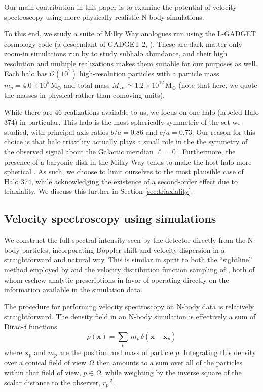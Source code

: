 \documentclass[aps,prl,10pt,twocolumn,superscriptaddress,showpacs]{revtex4-1}
\newcommand{\bvec}[1]{\mathbf{#1}}
\begin{document}
Our main contribution in this paper is to examine the potential of velocity spectroscopy using
more physically realistic N-body simulations.

To this end, we study a suite of Milky Way analogues run using the L-GADGET cosmology code
(a descendant of GADGET-2, \cite{springel2005}). These are dark-matter-only zoom-in simulations 
run by \cite{mao2015} to study subhalo abundance, and their high resolution and multiple
realizations makes them suitable for our purposes as well. Each halo has $\mathcal{O}(10^7)$
high-resolution particles with a particle mass $m_p=4.0\times10^5\, \mathrm{M_{\odot}}$ and total 
mass $M_{\mathrm{vir}}\simeq1.2\times10^{12}\,\mathrm{M_{\odot}}$ (note that here, we quote the masses in physical rather than comoving
units).

While there are 46 realizations available to us, we focus on one halo (labeled Halo 374) in particular. 
This halo is the most spherically-symmetric of the set we studied, with principal axis ratios
$b/a=0.86$ and $c/a=0.73$. Our reason for this choice is that halo triaxility actually plays a small role
in the the symmetry of the observed signal about the Galactic meridian $\ell=0^{\circ}$.
Furthermore, the presence of a baryonic disk in the Milky Way tends to make the host
halo more spherical \cite{debattista2008, bryan2013}. As such, we choose to limit ourselves to the most plausible case of
Halo 374, while acknowledging the existence of a second-order effect due to triaxiality. 
We discuss this further in Section \ref{sec:triaxiality}.


\subsection{Velocity spectroscopy using simulations}
\label{sec:simulations}

We construct the full
spectral intensity seen by the detector directly from the N-body particles, incorporating Doppler shift
and velocity dispersion in a straightforward and natural way.   This is similar in spirit to both the ``sightline'' method employed by 
\cite{lovell2015} and the velocity distribution function sampling of \cite{mao2013}, both of whom
eschew analytic prescriptions in favor of operating directly on the information available in the
simulation data. 

The procedure for performing velocity spectroscopy on N-body data is relatively straightforward.
The density field in an N-body simulation is effectively a sum of Dirac-$\delta$ functions
$$
\rho(\bvec{x}) = \sum_p\, m_p\, \delta(\bvec{x}-\bvec{x}_p)
$$
where $\bvec{x}_p$ and $m_p$ are the position and mass of particle $p$. Integrating this density over a conical
field of view $\Omega$ then amounts to a sum over all of the particles within that field of view, $p \in
\Omega$, while weighting by the inverse square of the scalar distance to the observer, $r^{-2}_p$. 
\end{document}

